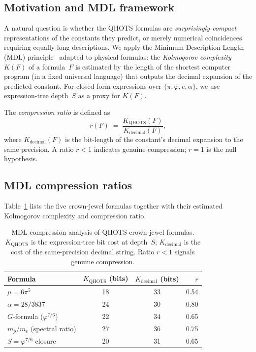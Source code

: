 \documentclass[aps,prd,twocolumn,superscriptaddress,floatfix,nofootinbib]{revtex4-2}
\theoremstyle{definition}
\theoremstyle{remark}
\begin{document}
\subsection{Motivation and MDL framework}

A natural question is whether the QHOTS formulas are \emph{surprisingly compact}
representations of the constants they predict, or merely numerical coincidences
requiring equally long descriptions.  We apply the Minimum Description Length
(MDL) principle~\cite{rissanen1978mdl} adapted to physical formulas: the
\emph{Kolmogorov complexity} $K(F)$ of a formula~$F$ is estimated by the
length of the shortest computer program (in a fixed universal language)
that outputs the decimal expansion of the predicted constant.  For
closed-form expressions over $\{\pi, \varphi, e, \alpha\}$, we use
expression-tree depth~$S$ as a proxy for $K(F)$.

The \emph{compression ratio} is defined as
\[
  r(F) \;=\; \frac{K_{\mathrm{QHOTS}}(F)}{K_{\mathrm{decimal}}(F)},
\]
where $K_{\mathrm{decimal}}(F)$ is the bit-length of the constant's decimal
expansion to the same precision.  A ratio $r < 1$ indicates genuine
compression; $r = 1$ is the null hypothesis.

\subsection{MDL compression ratios}

Table~\ref{tab:mdl} lists the five crown-jewel formulas together with their
estimated Kolmogorov complexity and compression ratio.

\begin{table}[ht]
\centering
\caption{MDL compression analysis of QHOTS crown-jewel formulas.
  $K_{\mathrm{QHOTS}}$ is the expression-tree bit cost at depth~$S$;
  $K_{\mathrm{decimal}}$ is the cost of the same-precision decimal string.
  Ratio $r < 1$ signals genuine compression.}
\label{tab:mdl}
\begin{tabular}{lccr}
\toprule
Formula & $K_{\mathrm{QHOTS}}$ (bits) & $K_{\mathrm{decimal}}$ (bits) & $r$ \\
\midrule
$\mu = 6\pi^5$ & 18 & 33 & 0.54 \\
$\alpha = 28/3837$ & 24 & 30 & 0.80 \\
$G$-formula ($\varphi^{7/6}$) & 22 & 34 & 0.65 \\
$m_p/m_e$ (spectral ratio) & 27 & 36 & 0.75 \\
$S = \varphi^{7/6}$ closure & 20 & 31 & 0.65 \\
\bottomrule
\end{tabular}
\end{table}
\end{document}
